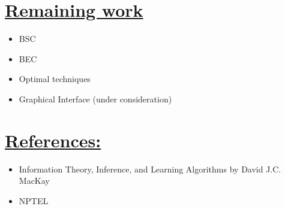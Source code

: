 \documentclass[12pt]{extarticle}
\newcommand{\<}{\langle}
\renewcommand{\>}{\rangle}
\theoremstyle{definition}
\begin{document}
\section{\underline{Remaining work}}
\begin{itemize}
    \item BSC
    \item BEC
    \item Optimal techniques
    \item Graphical Interface (under consideration)
\end{itemize}
\section{\underline{References:}} 
\begin{itemize}
    \item Information Theory, Inference, and Learning Algorithms by David J.C. MacKay
    \item NPTEL


\end{itemize}
\end{document}
